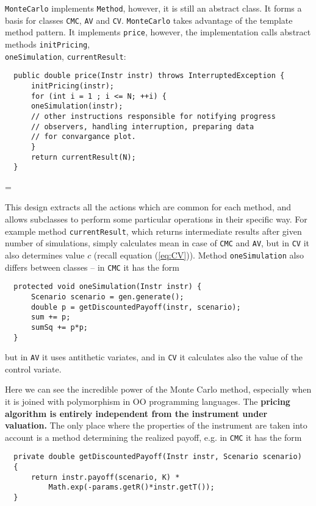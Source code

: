 \documentclass[a4paper,11pt, twoside]{book}
\newenvironment{absolutelynopagebreak}
  {\par\nobreak\vfill\penalty0\vfilneg
   \vtop\bgroup}
  {\par\xdef\tpd{\the\prevdepth}\egroup
   \prevdepth=\tpd}
\theoremstyle{definition}
\theoremstyle{remark}
\newcounter{example}[chapter]
\begin{document}
\texttt{MonteCarlo} implements \texttt{Method}, however, it is still an abstract class. It forms a basis for classes \texttt{CMC}, \texttt{AV} and \texttt{CV}. \texttt{MonteCarlo} takes advantage of the template method pattern. It implements \texttt{price}, however, the implementation calls abstract methods \texttt{initPricing},\\ \texttt{oneSimulation}, \texttt{currentResult}:
\begin{absolutelynopagebreak}
\begin{lstlisting}
  public double price(Instr instr) throws InterruptedException {
      initPricing(instr);
      for (int i = 1 ; i <= N; ++i) {
	  oneSimulation(instr);
	  // other instructions responsible for notifying progress
	  // observers, handling interruption, preparing data
	  // for convargance plot.
      }
      return currentResult(N);
  }
\end{lstlisting}
\end{absolutelynopagebreak}
   
This design extracts all the actions which are common for each method, and allows subclasses to perform some particular operations in their specific way. For example method \texttt{currentResult}, which returns intermediate results after given number of simulations, simply calculates mean in case of \texttt{CMC} and \texttt{AV}, but in \texttt{CV} it also determines value $c$ (recall equation (\ref{eq:CV})). Method \texttt{oneSimulation} also differs between classes -- in \texttt{CMC} it has the form

\begin{lstlisting}
  protected void oneSimulation(Instr instr) {
      Scenario scenario = gen.generate();
      double p = getDiscountedPayoff(instr, scenario);
      sum += p;
      sumSq += p*p;
  }
\end{lstlisting}
but in \texttt{AV} it uses antithetic variates, and in \texttt{CV} it calculates also the value of the control variate.

Here we can see the incredible power of the Monte Carlo method, especially when it is joined with polymorphism in OO programming languages. The \textbf{pricing algorithm is entirely independent from the instrument under valuation.} The only place where the properties of the instrument are taken into account is a method determining the realized payoff, e.g. in \texttt{CMC} it has the form

\begin{lstlisting}
  private double getDiscountedPayoff(Instr instr, Scenario scenario)
  { 
      return instr.payoff(scenario, K) *
	      Math.exp(-params.getR()*instr.getT());
  }
\end{lstlisting}
\end{document}
